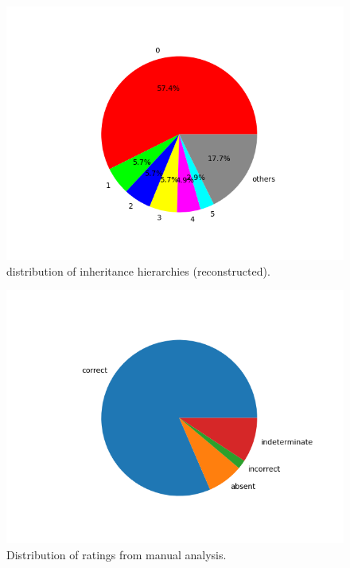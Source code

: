 \begin{figure}[htbp]
\centerline{\includegraphics[width=\linewidth]{"./distribution of inheritance hierarchies (reconstructed).png"}}
\caption{distribution of inheritance hierarchies (reconstructed).}
\label{fig}
\end{figure}


\begin{figure}[htbp]
\centerline{\includegraphics[width=\linewidth]{"./Distribution of ratings from manual analysis.png"}}
\caption{Distribution of ratings from manual analysis.}
\label{fig}
\end{figure}


